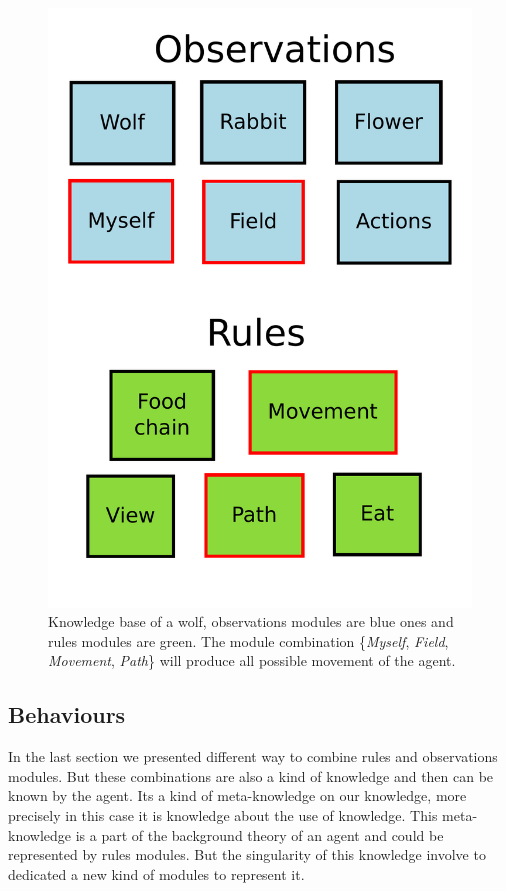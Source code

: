 \documentclass{aamas2012}
\begin{document}
	\begin{figure}
		\centering
		\includegraphics[keepaspectratio=true, scale=0.25]{module_combination.pdf}
		\caption
		{
			\label{module_combination}
			Knowledge base of a wolf, observations modules are blue ones and rules modules are green.
			The module combination \{\emph{Myself}, \emph{Field}, \emph{Movement}, \emph{Path}\} will produce all possible movement of the agent.
		}
	\end{figure}

\subsection{Behaviours}

	In the last section we presented different way to combine rules and observations modules.
	But these combinations are also a kind of knowledge and then can be known by the agent.
	Its a kind of meta-knowledge on our knowledge, more precisely in this case it is knowledge about the use of knowledge.
	This meta-knowledge is a part of the background theory of an agent and could be represented by rules modules.
	But the singularity of this knowledge involve to dedicated a new kind of modules to represent it.
\end{document}
